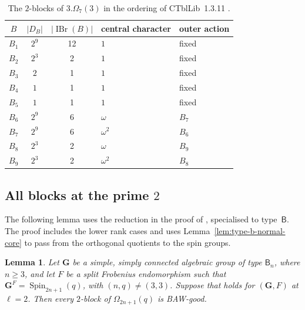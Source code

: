 \documentclass[10pt]{amsart}
\newtheorem{lemma}[theorem]{Lemma}
\theoremstyle{definition}
\renewcommand{\geq}{\geqslant}
\DeclareMathOperator{\IBr}{IBr}
\numberwithin{equation}{section}
\numberwithin{table}{section}
\begin{document}
\begin{table}[ht]
\centering
\scriptsize
\caption{The $2$-blocks of $3.\Omega_7(3)$ in the ordering of
CTblLib~1.3.11 \cite{CTblLib2025}.}
\label{tab:typeb-q3-blocks}
\begin{tabular}{@{}cccll@{}}
\toprule
$B$ & $|D_B|$ & $|\IBr(B)|$ & central character & outer action \\
\midrule
$B_1$ & $2^9$ & 12 & $1$ & fixed \\
$B_2$ & $2^3$ & 2 & $1$ & fixed \\
$B_3$ & $2$ & 1 & $1$ & fixed \\
$B_4$ & $1$ & 1 & $1$ & fixed \\
$B_5$ & $1$ & 1 & $1$ & fixed \\
$B_6$ & $2^9$ & 6 & $\omega$ & $B_7$ \\
$B_7$ & $2^9$ & 6 & $\omega^2$ & $B_6$ \\
$B_8$ & $2^3$ & 2 & $\omega$ & $B_9$ \\
$B_9$ & $2^3$ & 2 & $\omega^2$ & $B_8$ \\
\bottomrule
\end{tabular}
\end{table}

\subsection{All blocks at the prime \texorpdfstring{$2$}{2}}
\label{subsec:type-b-two-high-rank}

The following lemma uses the reduction in the proof of
\cite[Theorem~1]{FengYuZhang2024}, specialised to type~$\mathsf B$.
The proof includes the lower rank cases and uses
Lemma~\ref{lem:type-b-normal-core} to pass from the orthogonal
quotients to the spin groups.

\begin{lemma}
\label{lem:type-b-localized-return}
Let $\mathbf G$ be a simple, simply connected algebraic group of type
$\mathsf B_n$, where $n\geq3$, and let $F$ be a split Frobenius
endomorphism such that $\mathbf G^F=\operatorname{Spin}_{2n+1}(q)$,
with $(n,q)\neq(3,3)$.
Suppose that \cite[Assumption~5.3]{FengLiZhang2022Jordan} holds for
$(\mathbf G,F)$ at $\ell=2$. Then every $2$-block of
$\Omega_{2n+1}(q)$ is BAW-good.
\end{lemma}
\end{document}

